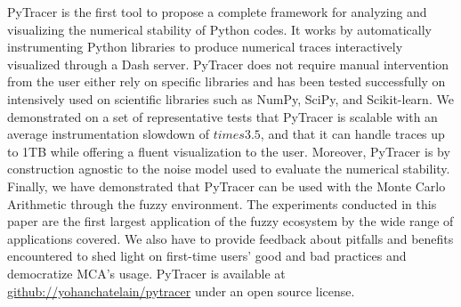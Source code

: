 \documentclass[11pt]{article}
\newcommand{\pytracer}[0]{PyTracer\xspace}
\begin{document}
\pytracer is the first tool to propose a complete framework
for analyzing and visualizing the numerical stability of Python codes.
It works by automatically instrumenting Python libraries to produce numerical
traces interactively visualized through a Dash server.
\pytracer does not require manual intervention from the user either rely on
specific libraries and has been tested successfully on 
intensively used on scientific libraries such as NumPy, SciPy, and Scikit-learn. We demonstrated on a set of representative tests that \pytracer is scalable with an average instrumentation slowdown of $times 3.5$, and that it can handle traces up to 1TB while offering a fluent visualization to the user. Moreover,
\pytracer is by construction agnostic to the noise model used 
to evaluate the numerical stability. Finally, we have demonstrated 
that \pytracer can be used with the Monte Carlo Arithmetic 
through the fuzzy environment. 
The experiments conducted in this paper are the first largest application of the fuzzy ecosystem by the wide range of applications covered. 
We also have to provide feedback about pitfalls and benefits encountered to shed light on first-time users' good and bad practices and democratize MCA's usage. 
\pytracer is available at \href{https://github.com/yohanchatelain/pytracer}{github://yohanchatelain/pytracer} under an open source license.




\end{document}
